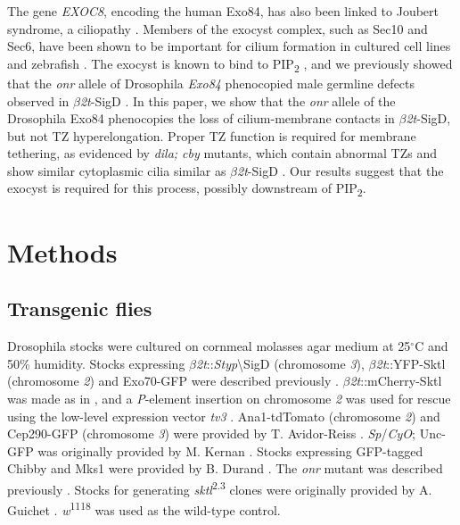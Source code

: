 \documentclass[12pt, twoside, letterpaper]{article}
\newcommand{\PIP}{PIP\textsubscript{2}}
\newcommand{\sigd}{$\beta$\textit{2t}-SigD}
\begin{document}
\begin{doublespacing}
\begin{linenumbers}
    The gene \textit{EXOC8}, encoding the human Exo84, has also
    been linked to Joubert syndrome, a ciliopathy
    \citep{dixon2012exome}.
    Members of the exocyst complex, such as Sec10 and Sec6, have been shown
    to be important for cilium formation in cultured cell lines and zebrafish
    \citep{zuo2009exocyst, lobo2017exocyst, seixas2016arl13b}.
    The exocyst is known to bind to \PIP{}
    \citep{he2007exo70, zhang2008membrane}, and we previously showed that
    the \textit{onr} allele of Drosophila \textit{Exo84} phenocopied
    male germline defects observed in \sigd{} \citep{fabian2010phosphatidylinositol}.
    In this paper, we show that the \textit{onr} allele of the Drosophila Exo84
    phenocopies the loss of cilium-membrane contacts in \sigd{},
    but not TZ hyperelongation.
    Proper TZ function is required for membrane tethering, as evidenced by
    \textit{dila; cby} mutants, which contain abnormal TZs
    and show similar cytoplasmic cilia similar as \sigd{} \citep{vieillard2016transition}.
    Our results suggest that the exocyst is required for this process,
    possibly downstream of \PIP{}.

    \section{Methods}
    \subsection{Transgenic flies}
    Drosophila stocks were cultured on cornmeal molasses agar medium at 25$^{\circ}$C
    and 50\% humidity.
    Stocks expressing $\beta$\textit{2t}::\textit{Styp}\textbackslash{SigD} (chromosome \textit{3}),
    $\beta$\textit{2t}::YFP-Sktl (chromosome \textit{2}) and
    Exo70-GFP
    were described previously \citep{wei2008depletion, fabian2010phosphatidylinositol}.
    $\beta$\textit{2t}::mCherry-Sktl was made as in \citep{wei2008depletion},
    and a \textit{P}-element insertion on chromosome \textit{2} was used for rescue using the low-level
    expression vector \textit{tv3} \citep{wong2005pip2}.
    Ana1-tdTomato (chromosome \textit{2}) and Cep290-GFP (chromosome \textit{3}) were provided
    by T. Avidor-Reiss \citep{basiri2014migrating}.
    \textit{Sp}/\textit{CyO}; Unc-GFP was originally provided by M. Kernan \citep{baker2004mechanosensory}.
    Stocks expressing GFP-tagged Chibby and Mks1 were
    provided by B. Durand \citep{enjolras2012drosophila, vieillard2016transition}.
    The \textit{onr} mutant was described previously \citep{giansanti2015exocyst}.
    Stocks for generating \textit{sktl}\textsuperscript{2.3} clones were originally provided by
    A. Guichet \citep{gervais2008pip5k}.
    \textit{w}\textsuperscript{1118} was used as the wild-type control.


\end{linenumbers}
\end{doublespacing}
\end{document}
